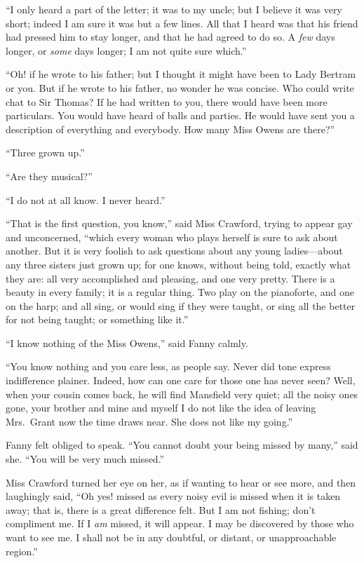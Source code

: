 \documentclass{article}
\begin{document}
``I only heard a part of the letter; it was to my uncle;
but I believe it was very short; indeed I am sure it was
but a few lines.  All that I heard was that his friend
had pressed him to stay longer, and that he had agreed
to do so.  A \emph{few} days longer, or \emph{some} days longer;
I am not quite sure which.''

``Oh! if he wrote to his father; but I thought it might
have been to Lady Bertram or you.  But if he wrote to
his father, no wonder he was concise.  Who could write
chat to Sir Thomas?  If he had written to you, there would
have been more particulars.  You would have heard of
balls and parties.  He would have sent you a description
of everything and everybody.  How many Miss Owens are there?''

``Three grown up.''

``Are they musical?''

``I do not at all know.  I never heard.''

``That is the first question, you know,'' said Miss Crawford,
trying to appear gay and unconcerned, ``which every
woman who plays herself is sure to ask about another.
But it is very foolish to ask questions about any
young ladies---about any three sisters just grown up;
for one knows, without being told, exactly what they are:
all very accomplished and pleasing, and one very pretty.
There is a beauty in every family; it is a regular thing.
Two play on the pianoforte, and one on the harp;
and all sing, or would sing if they were taught,
or sing all the better for not being taught; or something
like it.''

``I know nothing of the Miss Owens,'' said Fanny calmly.

``You know nothing and you care less, as people say.
Never did tone express indifference plainer.  Indeed, how can
one care for those one has never seen?  Well, when your
cousin comes back, he will find Mansfield very quiet;
all the noisy ones gone, your brother and mine and myself
I do not like the idea of leaving Mrs.\ Grant now the time
draws near.  She does not like my going.''

Fanny felt obliged to speak.  ``You cannot doubt your being
missed by many,'' said she.  ``You will be very much missed.''

Miss Crawford turned her eye on her, as if wanting to hear
or see more, and then laughingly said, ``Oh yes! missed
as every noisy evil is missed when it is taken away;
that is, there is a great difference felt.  But I am
not fishing; don't compliment me.  If I \emph{am} missed,
it will appear.  I may be discovered by those who want
to see me.  I shall not be in any doubtful, or distant,
or unapproachable region.''
\end{document}
